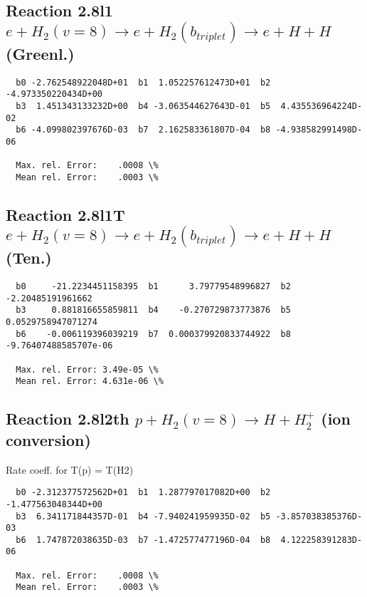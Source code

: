\documentclass[12pt,dvipdfmx]{article}
\begin{document}
\newpage
\subsection{
Reaction 2.8l1
$ e + H_2(v=8) \rightarrow e + H_2(b_{triplet})\rightarrow e +  H + H $ (Greenl.)
}


\begin{small}\begin{verbatim}
  b0 -2.762548922048D+01  b1  1.052257612473D+01  b2 -4.973350220434D+00
  b3  1.451343133232D+00  b4 -3.063544627643D-01  b5  4.435536964224D-02
  b6 -4.099802397676D-03  b7  2.162583361807D-04  b8 -4.938582991498D-06

  Max. rel. Error:    .0008 \%
  Mean rel. Error:    .0003 \%
\end{verbatim}\end{small}


\subsection{
Reaction 2.8l1T
$ e +  H_2(v=8) \rightarrow e +  H_2(b_{triplet}) \rightarrow e + H + H $ (Ten.)
}


\begin{small}\begin{verbatim}
  b0     -21.2234451158395  b1      3.79779548996827  b2     -2.20485191961662
  b3     0.881816655859811  b4    -0.270729873773876  b5    0.0529758947071274
  b6    -0.006119396039219  b7  0.000379920833744922  b8 -9.76407488585707e-06

  Max. rel. Error: 3.49e-05 \%
  Mean rel. Error: 4.631e-06 \%
\end{verbatim}\end{small}


\subsection{
Reaction 2.8l2th
$ p + H_2(v=8) \rightarrow H + H_2^+$ (ion conversion)
}
Rate coeff. for T(p) = T(H2)

\begin{small}\begin{verbatim}
  b0 -2.312377572562D+01  b1  1.287797017082D+00  b2 -1.477563048344D+00
  b3  6.341171844357D-01  b4 -7.940241959935D-02  b5 -3.857038385376D-03
  b6  1.747872038635D-03  b7 -1.472577477196D-04  b8  4.122258391283D-06

  Max. rel. Error:    .0008 \%
  Mean rel. Error:    .0003 \%
\end{verbatim}\end{small}
\end{document}
